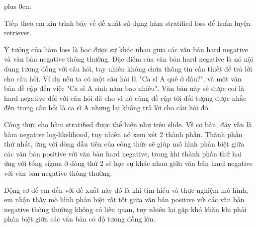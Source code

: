 \documentclass[11pt]{beamer}
\renewcommand{\raggedright}{\leftskip=0pt \rightskip=0pt plus 0cm}
\let\olditemize=\itemize
\renewenvironment{itemize}{\olditemize\raggedright}{\endlist}
\begin{document}
\begin{frame}
\begin{itemize}
	\item {\fontsize{7pt}{\baselineskip}\selectfont Tiếp theo em xin trình bày về đề xuất sử dụng hàm stratified loss để huấn luyện retriever.}
	\item {\fontsize{7pt}{\baselineskip}\selectfont Ý tưởng của hàm loss là học được sự khác nhau giữa các văn bản hard negative và văn bản negative thông thường. Đặc điểm của văn bản hard negative là nó nội dung tương đồng với câu hỏi, tuy nhiên không chứa thông tin cần thiết để trả lời cho câu hỏi. Ví dụ nếu ta có một câu hỏi là "Ca sĩ A quê ở đâu?", và một văn bản đề cập đến việc "Ca sĩ A sinh năm bao nhiêu". Văn bản này sẽ được coi là hard negative đối với câu hỏi đã cho vì nó cùng đề cập tới đối tượng được nhắc đến trong câu hỏi là ca sĩ A nhưng lại không trả lời cho câu hỏi đó.}
	\item {\fontsize{7pt}{\baselineskip}\selectfont Công thức cho hàm stratified được thể hiện như trên slide. Về cơ bản, đây vẫn là hàm negative log-likelihood, tuy nhiên nó xem xét 2 thành phần. Thành phần thứ nhất, ứng với dòng đầu tiên của công thức sẽ giúp mô hình phân biệt giữa các văn bản positive với văn bản hard negative, trong khi thành phần thứ hai ứng với tổng sigma ở dòng thứ 2 sẽ học sự khác nhau giữa văn bản hard negative với văn bản negative thông thường.}
	\item {\fontsize{7pt}{\baselineskip}\selectfont Động cơ để em đến với đề xuất này đó là khi tìm hiểu và thực nghiệm mô hình, em nhận thấy mô hình phân biệt rất tốt giữa văn bản positive với các văn bản negative thông thường không có liên quan, tuy nhiên lại gặp khó khăn khi phải phân biệt giữa các văn bản có độ tương đồng lớn.}
\end{itemize}
\end{frame}
\end{document}
